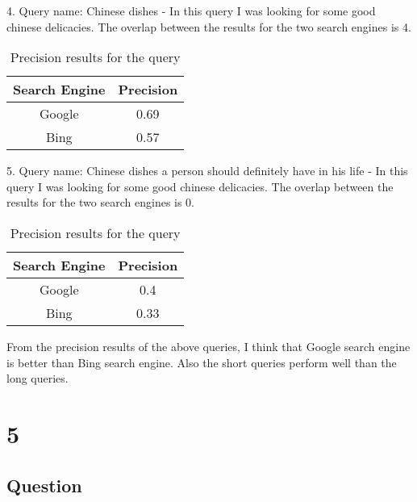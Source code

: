 \documentclass[letterpaper,11pt]{article}
\begin{document}
4. Query name: Chinese dishes - In this query I was looking for some good chinese delicacies. The overlap between the results for the two search engines is 4.

\begin{table}[h]
\centering
\begin{adjustbox}{max width=\linewidth}
\begin{tabular}{ | c | c | }
\hline
\textbf{Search Engine} & \textbf{Precision}  \\
\hline
Google &  0.69\\ 
\hline
Bing & 0.57 \\ 
\hline
\end{tabular}
\end{adjustbox}
\caption{Precision results for the query}
\label{table:q3calcs}
\end{table} 

5. Query name: Chinese dishes a person should definitely have in his life - In this query I was looking for some good chinese delicacies. The overlap between the results for the two search engines is 0.

\begin{table}[h]
\centering
\begin{adjustbox}{max width=\linewidth}
\begin{tabular}{ | c | c | }
\hline
\textbf{Search Engine} & \textbf{Precision}  \\
\hline
Google &  0.4\\ 
\hline
Bing & 0.33 \\ 
\hline
\end{tabular}
\end{adjustbox}
\caption{Precision results for the query}
\label{table:q3calcs}
\end{table} 

From the precision results of the above queries, I think that Google search engine is better than Bing search engine. Also the short queries perform well than the long queries.  
\clearpage


\section*{5}

\subsection*{Question}
\end{document}
